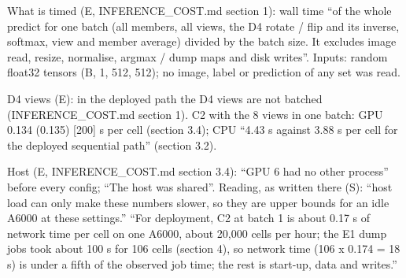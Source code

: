 \begin{table}[htbp]
\begin{tabular}
\bottomrule
\end{tabular}
\par\smallskip
\begin{minipage}{\linewidth}\scriptsize\raggedright
What is timed (E, INFERENCE\_\allowbreak{}COST.md section 1): wall time ``of the whole predict for one batch (all members, all views, the D4 rotate / flip and its inverse, softmax, view and member average) divided by the batch size. It excludes image read, resize, normalise, argmax / dump maps and disk writes''. Inputs: random float32 tensors (B, 1, 512, 512); no image, label or prediction of any set was read.\par
D4 views (E): in the deployed path the D4 views are not batched (INFERENCE\_\allowbreak{}COST.md section 1). C2 with the 8 views in one batch: GPU 0.134 (0.135) [200] s per cell (section 3.4); CPU ``4.43 s against 3.88 s per cell for the deployed sequential path'' (section 3.2).\par
Host (E, INFERENCE\_\allowbreak{}COST.md section 3.4): ``GPU 6 had no other process'' before every config; ``The host was shared''. Reading, as written there (S): ``host load can only make these numbers slower, so they are upper bounds for an idle A6000 at these settings.'' ``For deployment, C2 at batch 1 is about 0.17 s of network time per cell on one A6000, about 20,000 cells per hour; the E1 dump jobs took about 100 s for 106 cells (section 4), so network time (106 x 0.174 = 18 s) is under a fifth of the observed job time; the rest is start-up, data and writes.''\par
\end{minipage}
\end{table}
